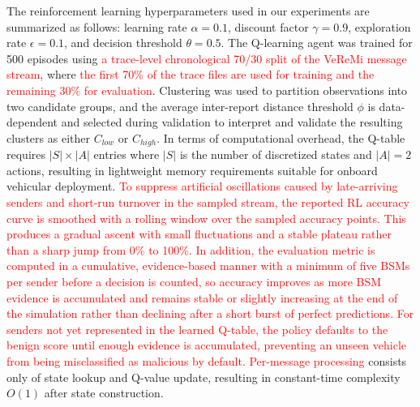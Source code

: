\documentclass[conference]{IEEEtran}
\begin{document}
The reinforcement learning hyperparameters used in our experiments are summarized as follows: learning rate $\alpha = 0.1$, discount factor $\gamma = 0.9$, exploration rate $\epsilon = 0.1$, and decision threshold $\theta = 0.5$. The Q-learning agent was trained for 500 episodes using \textcolor{red}{a trace-level chronological 70/30 split of the VeReMi message stream}, where \textcolor{red}{the first 70\% of the trace files are used for training and the remaining 30\% for evaluation}. Clustering was used to partition observations into two candidate groups, and the average inter-report distance threshold $\phi$ is data-dependent and selected during validation to interpret and validate the resulting clusters as either $C_{low}$ or $C_{high}$. In terms of computational overhead, the Q-table requires $|S|\times|A|$ entries where $|S|$ is the number of discretized states and $|A|=2$ actions, resulting in lightweight memory requirements suitable for onboard vehicular deployment. \textcolor{red}{To suppress artificial oscillations caused by late-arriving senders and short-run turnover in the sampled stream, the reported RL accuracy curve is smoothed with a rolling window over the sampled accuracy points. This produces a gradual ascent with small fluctuations and a stable plateau rather than a sharp jump from 0\% to 100\%. In addition, the evaluation metric is computed in a cumulative, evidence-based manner with a minimum of five BSMs per sender before a decision is counted, so accuracy improves as more BSM evidence is accumulated and remains stable or slightly increasing at the end of the simulation rather than declining after a short burst of perfect predictions. For senders not yet represented in the learned Q-table, the policy defaults to the benign score until enough evidence is accumulated, preventing an unseen vehicle from being misclassified as malicious by default. Per-message processing} consists only of state lookup and Q-value update, resulting in constant-time complexity $O(1)$ after state construction.
\end{document}
